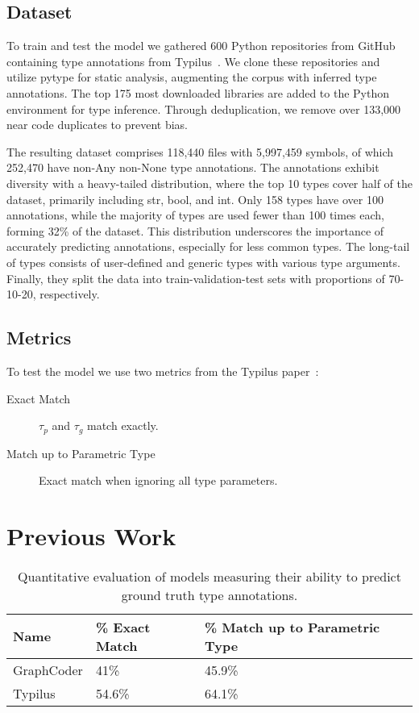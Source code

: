 \documentclass[sigplan,natbib=false]{acmart}
\begin{document}
\subsection{Dataset}\label{subsec:dataset}

To train and test the model we gathered 600 Python repositories from GitHub containing type annotations from Typilus~\cite{allamanis2020typilus}.
We clone these repositories and utilize pytype for static analysis, augmenting the corpus with inferred type annotations.
The top 175 most downloaded libraries are added to the Python environment for type inference.
Through deduplication, we remove over 133,000 near code duplicates to prevent bias.

The resulting dataset comprises 118,440 files with 5,997,459 symbols, of which 252,470 have non-Any non-None type annotations.
The annotations exhibit diversity with a heavy-tailed distribution, where the top 10 types cover half of the dataset, primarily including str, bool, and int.
Only 158 types have over 100 annotations, while the majority of types are used fewer than 100 times each, forming 32\% of the dataset.
This distribution underscores the importance of accurately predicting annotations, especially for less common types.
The long-tail of types consists of user-defined and generic types with various type arguments.
Finally, they split the data into train-validation-test sets with proportions of 70-10-20, respectively.

\subsection{Metrics}\label{subsec:metrics}

To test the model we use two metrics from the Typilus paper~\cite{allamanis2020typilus}:

\begin{description}
    \item[Exact Match] $\tau_p$ and $\tau_g$ match exactly.
    \item[Match up to Parametric Type] Exact match when ignoring all type parameters.
\end{description}

\section{Previous Work}\label{sec:previous-work}

\begin{table*}
    \centering
    \begin{tabular}{lll}
        \toprule
        \textbf{Name} & \textbf{\% Exact Match} & \textbf{\% Match up to Parametric Type} \\
        \midrule
        GraphCoder & 41\% & 45.9\%  \\
        Typilus & 54.6\% & 64.1\% \\
        \bottomrule
    \end{tabular}
    \caption{Quantitative evaluation of models measuring their ability to
    predict ground truth type annotations.}
    \label{tab:human-eval-results}
\end{table*}
\end{document}
